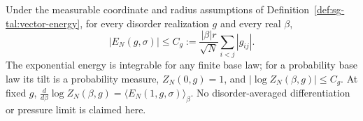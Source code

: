 \begin{lemma}\label{lem:sg-tal:vector-normalization}
\leanok
{}
Under the measurable coordinate and radius assumptions of Definition~\ref{def:sg-tal:vector-energy},
for every disorder realization $g$ and every real $\beta$,
\[
|E_N(g,\sigma)|\le C_g:=\frac{|\beta|r}{\sqrt N}\sum_{i<j}|g_{ij}|.
\]
The exponential energy is integrable for any finite base law; for a probability base law
its tilt is a probability measure, $Z_N(0,g)=1$, and $|\log Z_N(\beta,g)|\le C_g$.
At fixed $g$, $\frac{d}{d\beta}\log Z_N(\beta,g)=\langle E_N(1,g,\sigma)\rangle_\beta$.
No disorder-averaged differentiation or pressure limit is claimed here.
\end{lemma}


